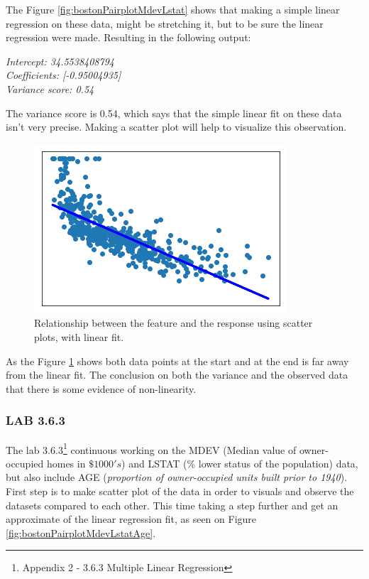 The Figure \ref{fig:bostonPairplotMdevLstat} shows that making a simple linear regression on these data, might be stretching it, but to be sure the linear regression were made. Resulting in the following output:

\noindent\textit{Intercept: 34.5538408794\\
Coefficients: [-0.95004935]\\
Variance score: 0.54\\}

The variance score is 0.54, which says that the simple linear fit on these data isn't very precise. Making a scatter plot will help to visualize this observation.

\begin{figure}[h]
	\centering
	\includegraphics[scale=0.6]{regression/multipleLinearRegression/fig/bostonScatterplotMdevLstatLinreg.png}
	\caption{Relationship between the feature and the response using scatter plots, with linear fit.}
	\label{fig:bostonScatterplotMdevLstatLinreg}
\end{figure}

As the Figure \ref{fig:bostonScatterplotMdevLstatLinreg} shows both data points at the start and at the end is far away from the linear fit. The conclusion on both the variance and the observed data that there is some evidence of non-linearity.

\subsubsection*{LAB 3.6.3}
The lab 3.6.3\footnote{Appendix 2 - 3.6.3 Multiple Linear Regression} continuous working on the MDEV (Median value of owner-occupied homes in $\$1000's$) and LSTAT (\% lower status of the population) data, but also include AGE (\textit{proportion of owner-occupied units built prior to 1940}). First step is to make scatter plot of the data in order to visuals and observe the datasets compared to each other. This time taking a step further and get an approximate of the linear regression fit, as seen on Figure \ref{fig:bostonPairplotMdevLstatAge}.

